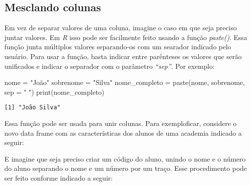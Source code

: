 \documentclass[
  letterpaper,
  DIV=11,
  numbers=noendperiod]{scrreprt}
\newenvironment{Shaded}{\begin{snugshade}}{\end{snugshade}}
\newcommand{\AttributeTok}[1]{\textcolor[rgb]{0.40,0.45,0.13}{#1}}
\newcommand{\FunctionTok}[1]{\textcolor[rgb]{0.28,0.35,0.67}{#1}}
\newcommand{\NormalTok}[1]{\textcolor[rgb]{0.00,0.23,0.31}{#1}}
\newcommand{\OtherTok}[1]{\textcolor[rgb]{0.00,0.23,0.31}{#1}}
\newcommand{\SpecialCharTok}[1]{\textcolor[rgb]{0.37,0.37,0.37}{#1}}
\newcommand{\StringTok}[1]{\textcolor[rgb]{0.13,0.47,0.30}{#1}}
\begin{document}
\subsection{Mesclando colunas}\label{mesclando-colunas}

Em vez de separar valores de uma coluna, imagine o caso em que seja
preciso juntar valores. Em \emph{R} isso pode ser facilmente feito
usando a função \emph{paste()}. Essa função junta múltiplos valores
separando-os com um searador indicado pelo usuário. Para usar a função,
basta indicar entre parênteses os valores que serão unificados e indicar
o separador com o parâmetro \emph{``sep''}. Por exemplo:

\begin{Shaded}
\begin{Highlighting}[]
\NormalTok{nome }\OtherTok{=} \StringTok{"João"}
\NormalTok{sobrenome }\OtherTok{=} \StringTok{"Silva"}
\NormalTok{nome\_completo }\OtherTok{=} \FunctionTok{paste}\NormalTok{(nome, sobrenome, }\AttributeTok{sep =} \StringTok{" "}\NormalTok{)}
\FunctionTok{print}\NormalTok{(nome\_completo)}
\end{Highlighting}
\end{Shaded}

\begin{verbatim}
[1] "João Silva"
\end{verbatim}

Essa função pode ser usada para unir colunas. Para exemploficar,
considere o novo data frame com as características dos alunos de uma
academia indicado a seguir:

\begin{Shaded}
\end{Shaded}

E imagine que seja preciso criar um código do aluno, unindo o nome e o
número do aluno separando o nome e um número por um traço. Esse
procedimento pode ser feito conforme indicado a seguir:

\begin{Shaded}
\end{Shaded}
\end{document}
